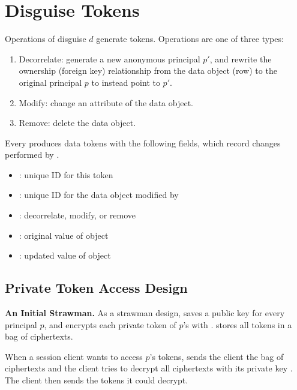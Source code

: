 \section{Disguise Tokens}

Operations  of disguise $d$ generate tokens. Operations are one of three types:
\begin{enumerate}
    \item Decorrelate: generate a new anonymous principal $p'$, and rewrite the ownership (foreign key)
        relationship from the data object (row) to the original principal $p$ to instead point to $p'$.
    \item Modify: change an attribute of the data object.
    \item Remove: delete the data object.
\end{enumerate}

\noindent
Every  produces data tokens  with the following fields, which record changes
performed by .
\begin{itemize}
\item {}:  unique ID for this token
\item {}:  unique ID for the data object modified by 
\item {}:  decorrelate, modify, or remove
\item {}:  original value of object 
\item {}:  updated value of object 
\end{itemize}


\subsection{Private Token Access Design}

\vspace{6pt}
\noindent\textbf{An Initial Strawman.}
As a strawman design, \sys saves a public key  for every principal $p$, and 
encrypts each private token of $p$'s with . 
\sys stores all tokens in a bag of ciphertexts.

When a session client wants to access $p$'s tokens, \sys sends the client the bag of ciphertexts and
the client tries to decrypt all ciphertexts with its private key .
The client then sends \sys the tokens it could decrypt.

